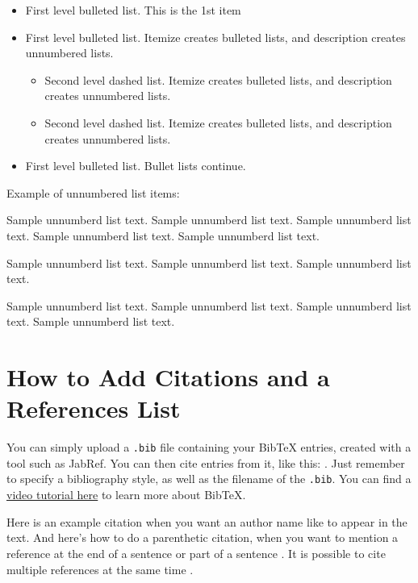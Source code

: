 \documentclass[12pt,a4paper]{article}
\newenvironment{unlist}{%
  \begin{list}{}{%
    \setlength{\labelwidth}{0pt}%
    \setlength{\labelsep}{0pt}%
    \setlength{\leftmargin}{2em}%
    \setlength{\itemindent}{-2em}%
    \setlength{\topsep}{\medskipamount}%
    \setlength{\itemsep}{3pt}%
  }%
}{%
  \end{list}%
}
\begin{document}
\begin{itemize}
\item First level bulleted list. This is the 1st item
\item First level bulleted list. Itemize creates bulleted lists, and description creates unnumbered lists.

\begin{itemize}
\item Second level dashed list. Itemize creates bulleted lists, and description creates unnumbered lists.
\item Second level dashed list. Itemize creates bulleted lists, and description creates unnumbered lists.
\end{itemize}

\item First level bulleted list. Bullet lists continue.
\end{itemize}

\noindent
Example of unnumbered list items:

\begin{unlist}
\item Sample unnumberd list text. Sample unnumberd list text. Sample unnumberd list text. Sample unnumberd list text. Sample unnumberd list text.

\item Sample unnumberd list text. Sample unnumberd list text. Sample unnumberd list text.

\item Sample unnumberd list text. Sample unnumberd list text. Sample unnumberd list text. Sample unnumberd list text. 
\end{unlist}


\section{How to Add Citations and a References List}

You can simply upload a \verb|.bib| file containing your BibTeX entries, created with a tool such as JabRef. You can then cite entries from it, like this: \textcite{greenwade93}. Just remember to specify a bibliography style, as well as the filename of the \verb|.bib|. You can find a \href{https://www.overleaf.com/help/97-how-to-include-a-bibliography-using-bibtex}{video tutorial here} to learn more about BibTeX.

Here is an example citation when you want an author name like \textcite{collins2011a} to appear in the text. And here's how to do a parenthetic citation, when you want to mention a reference at the end of a sentence or part of a sentence \parencite{collins2013}. It is possible to cite multiple references at the same time \parencite{collins2011b,collins2016,lunn2007a,lunn2007b,ross2006,shannon1948}.
\end{document}
